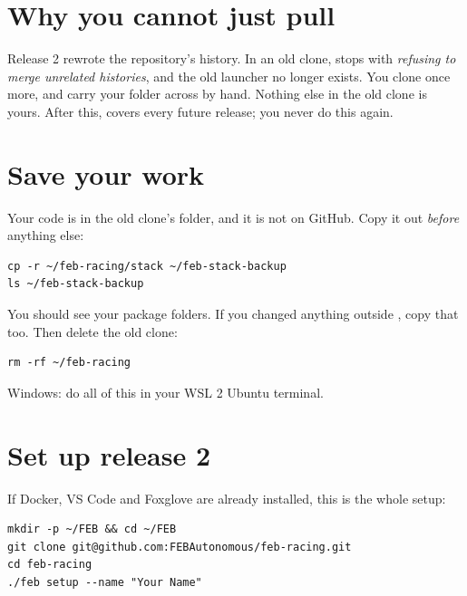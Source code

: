 \documentclass[11pt,a4paper]{article}
\begin{document}

\section{Why you cannot just pull}

Release 2 rewrote the repository's history. In an old clone,  stops with
\emph{refusing to merge unrelated histories}, and the old launcher  no longer exists.
You clone once more, and carry your  folder across by hand. Nothing else in the old
clone is yours. After this,  covers every future release; you never do this again.

\section{Save your work}

Your code is in the old clone's  folder, and it is not on GitHub. Copy it out
\emph{before} anything else:

\begin{lstlisting}
cp -r ~/feb-racing/stack ~/feb-stack-backup
ls ~/feb-stack-backup
\end{lstlisting}

You should see your package folders. If you changed anything outside , copy that
too. Then delete the old clone:

\begin{lstlisting}
rm -rf ~/feb-racing
\end{lstlisting}

Windows: do all of this in your WSL 2 Ubuntu terminal.

\section{Set up release 2}

If Docker, VS Code and Foxglove are already installed, this is the whole setup:

\begin{lstlisting}
mkdir -p ~/FEB && cd ~/FEB
git clone git@github.com:FEBAutonomous/feb-racing.git
cd feb-racing
./feb setup --name "Your Name"
\end{lstlisting}
\end{document}
